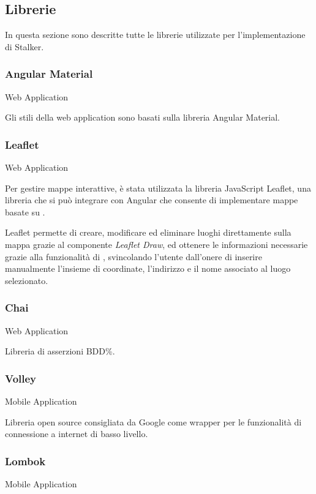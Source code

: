 \documentclass[../../../analisi-dei-requisiti.tex]{subfiles}
\begin{document}
\subsection{Librerie}%
\label{sub:librerie}
In questa sezione sono descritte tutte le librerie utilizzate per l'implementazione di Stalker.

\subsubsection{Angular Material}%
\label{subs:angular_material}
Web Application

Gli stili della web application sono basati sulla libreria Angular Material.

\subsubsection{Leaflet}%
\label{subs:leaflet}
Web Application

Per gestire mappe interattive, è stata utilizzata la libreria JavaScript Leaflet, una libreria che si può integrare con Angular che consente di implementare mappe basate su .

Leaflet permette di creare, modificare ed eliminare luoghi direttamente sulla mappa grazie al componente \textit{Leaflet Draw}, ed ottenere le informazioni necessarie grazie alla funzionalità di , svincolando l'utente dall'onere di inserire manualmente l'insieme di coordinate, l'indirizzo e il nome associato al luogo selezionato.

\subsubsection{Chai}%
\label{subs:chai}
Web Application

Libreria di asserzioni BDD\%.

\subsubsection{Volley}%
\label{subs:volley}
Mobile Application

Libreria open source consigliata da Google come wrapper per le funzionalità di connessione a internet di basso livello.

\subsubsection{Lombok}%
\label{subs:lombok}
Mobile Application
\end{document}
